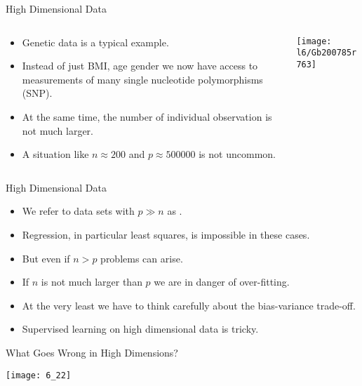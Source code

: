 \documentclass[mathserif, aspectratio=169]{beamer}
\begin{document}
\begin{frame}{High Dimensional Data}
	\begin{columns}
		\begin{column}{0.5\textwidth}
			\begin{itemize}
				\item Genetic data is a typical example.
				\item Instead of just BMI, age gender we now have
					access to measurements of many single nucleotide polymorphisms (SNP).
				\item At the same time, the number of individual observation
					is not much larger.
				\item A situation like $n\approx 200$ and $p \approx 500000$ is not uncommon.
			\end{itemize}
		\end{column}
		\begin{column}{0.5\textwidth}
			\texttt{[image: l6/Gb200785r763]}
		\end{column}
	\end{columns}
\end{frame}

\begin{frame}{High Dimensional Data}
	\begin{itemize}
		\item We refer to data sets with $p \gg n$ as .
		\item Regression, in particular least squares, is impossible in these cases.
		\item But even if $n > p$ problems can arise.
		\item If $n$ is not much larger than $p$ we are in danger of over-fitting.
		\item At the very least we have to think carefully about the bias-variance trade-off.
		\item Supervised learning on high dimensional data is tricky.
	\end{itemize}
\end{frame}

\begin{frame}{What Goes Wrong in High Dimensions?}
	\begin{center}
		\texttt{[image: 6\_22]}
	\end{center}
\end{frame}
\end{document}
